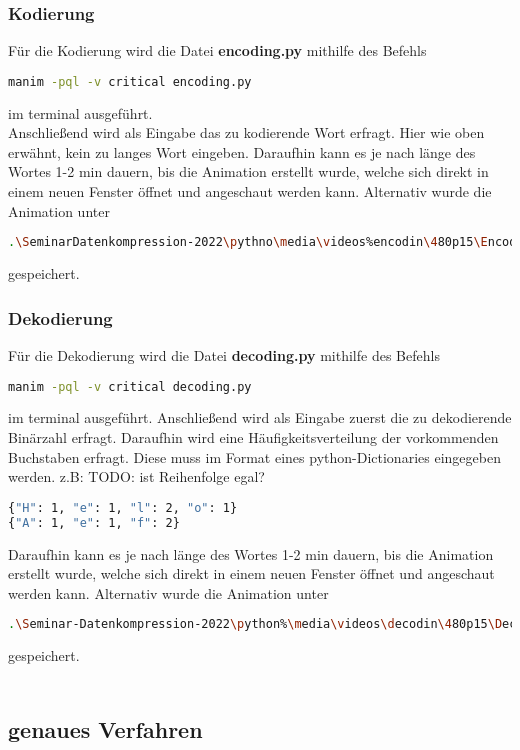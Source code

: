 \documentclass[a4paper]{article}
\theoremstyle{definition}
\theoremstyle{remark}
\begin{document}
\subsubsection{Kodierung}
Für die Kodierung wird die Datei \textbf{encoding.py} mithilfe des Befehls
\begin{lstlisting}[language=bash,
numbers=none]
manim -pql -v critical encoding.py
\end{lstlisting}
im terminal ausgeführt.
\\
Anschließend wird als Eingabe das zu kodierende Wort erfragt. Hier wie oben erwähnt, kein zu langes Wort eingeben.
Daraufhin kann es je nach länge des Wortes 1-2 min dauern, bis die Animation erstellt
wurde, welche sich direkt in einem neuen Fenster öffnet und angeschaut werden kann.
Alternativ wurde die Animation unter
\begin{lstlisting}[language=bash, numbers=none]
.\SeminarDatenkompression-2022\pythno\media\videos%encodin\480p15\Encoding.mp4
\end{lstlisting}
gespeichert.
\subsubsection{Dekodierung}
Für die Dekodierung wird die Datei \textbf{decoding.py} mithilfe des Befehls
\begin{lstlisting}[language=bash,
numbers=none]
manim -pql -v critical decoding.py
\end{lstlisting}
im terminal ausgeführt.
Anschließend wird als Eingabe zuerst die zu dekodierende Binärzahl
erfragt. Daraufhin wird eine Häufigkeitsverteilung der vorkommenden Buchstaben erfragt.
Diese muss im Format eines python-Dictionaries eingegeben werden.
z.B: TODO: ist Reihenfolge egal?
\begin{lstlisting}[language=bash,
numbers=none]
{"H": 1, "e": 1, "l": 2, "o": 1}
{"A": 1, "e": 1, "f": 2}
\end{lstlisting}
Daraufhin kann es je nach länge des Wortes 1-2 min dauern, bis die Animation erstellt
wurde, welche sich direkt in einem neuen Fenster öffnet und angeschaut werden kann.
Alternativ wurde die Animation unter
\begin{lstlisting}[language=bash,
numbers=none]
.\Seminar-Datenkompression-2022\python%\media\videos\decodin\480p15\Decoding.mp4
\end{lstlisting}
gespeichert.
\\
\\
\subsection{genaues Verfahren}
\end{document}
